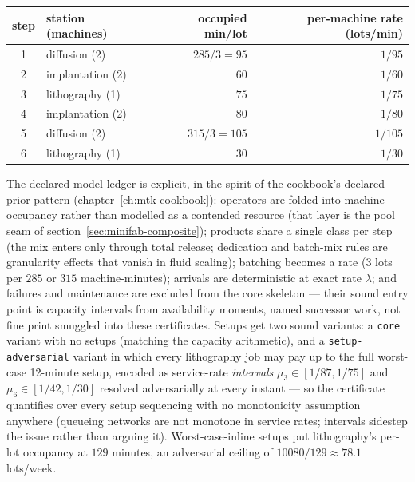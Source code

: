 \begin{center}\small
\begin{tabular}{@{}clrr@{}}
\toprule
step & station (machines) & occupied min/lot & per-machine rate (lots/min)\\
\midrule
1 & diffusion (2)    & $285/3 = 95$  & $1/95$\\
2 & implantation (2) & $60$          & $1/60$\\
3 & lithography (1)  & $75$          & $1/75$\\
4 & implantation (2) & $80$          & $1/80$\\
5 & diffusion (2)    & $315/3 = 105$ & $1/105$\\
6 & lithography (1)  & $30$          & $1/30$\\
\bottomrule
\end{tabular}
\end{center}

\noindent The declared-model ledger is explicit, in the spirit of the
cookbook's declared-prior pattern
(chapter~\ref{ch:mtk-cookbook}): operators are folded into machine
occupancy rather than modelled as a contended resource (that layer is
the pool seam of section~\ref{sec:minifab-composite}); products share
a single class per step (the mix enters only through total release;
dedication and batch-mix rules are granularity effects that vanish in
fluid scaling); batching becomes a rate ($3$ lots per $285$ or $315$
machine-minutes); arrivals are deterministic at exact rate $\lambda$;
and failures and maintenance are excluded from the core skeleton ---
their sound entry point is capacity intervals from availability
moments, named successor work, not fine print smuggled into these
certificates. Setups get two sound variants: a \texttt{core} variant
with no setups (matching the capacity arithmetic), and a
\texttt{setup-adversarial} variant in which every lithography job may
pay up to the full worst-case 12-minute setup, encoded as service-rate
\emph{intervals} $\mu_3 \in [1/87, 1/75]$ and $\mu_6 \in [1/42,
1/30]$ resolved adversarially at every instant --- so the certificate
quantifies over every setup sequencing with no monotonicity
assumption anywhere (queueing networks are not monotone in service
rates; intervals sidestep the issue rather than arguing it).
Worst-case-inline setups put lithography's per-lot occupancy at $129$
minutes, an adversarial ceiling of $10080/129 \approx 78.1$
lots/week.

